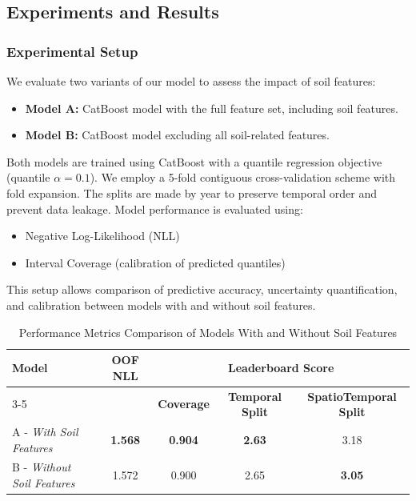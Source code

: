 \documentclass[ruler]{CUP-JNL-EDS}%
\begin{document}
\subsection{Experiments and Results}
\subsubsection{Experimental Setup}
We evaluate two variants of our model to assess the impact of soil features:
\begin{itemize}
    \item \textbf{Model A:} CatBoost model with the full feature set, including soil features.
    \item \textbf{Model B:} CatBoost model excluding all soil-related features.
\end{itemize}

Both models are trained using CatBoost with a quantile regression objective (quantile $\alpha=0.1$).
We employ a 5-fold contiguous cross-validation scheme with fold expansion. The splits are made by year to 
preserve temporal order and prevent data leakage. Model performance is evaluated using:
\begin{itemize}
    \item Negative Log-Likelihood (NLL)
    \item Interval Coverage (calibration of predicted quantiles)
\end{itemize}

\noindent This setup allows comparison of predictive accuracy, uncertainty quantification, and calibration 
between models with and without soil features.

\begin{table}[!htbp]
\centering
\label{tab:metrics_comparison}
\begin{tabular}{lcccc}
\hline
\textbf{Model} & \textbf{OOF NLL} & \multicolumn{3}{c}{\textbf{Leaderboard Score}} \\
\cline{3-5}
 & & \textbf{Coverage} & \textbf{Temporal Split} & \textbf{SpatioTemporal Split} \\
\hline
A - \textit{With Soil Features} & \textbf{1.568} & \textbf{0.904} & \textbf{2.63} & 3.18 \\
B - \textit{Without Soil Features} & 1.572 & 0.900 & 2.65 & \textbf{3.05} \\
\end{tabular}
\caption{Performance Metrics Comparison of Models With and Without Soil Features}
\end{table}
\end{document}
